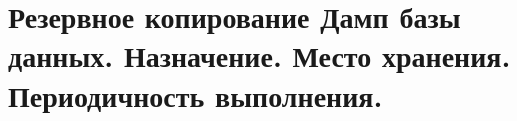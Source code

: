 {
	\section{Резервное копирование Дамп базы данных. Назначение. Место хранения. Периодичность выполнения.}
	\newpage
}

